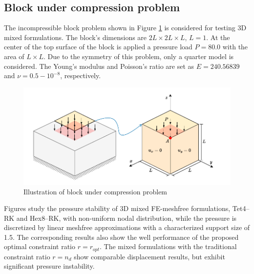 \subsection{Block under compression problem}
The incompressible block problem shown in Figure \ref{fg:block_model} is considered for testing 3D mixed formulations. The block's dimensions are $2L\times 2L \times L$, $L=1$.
At the center of the top surface of the block is applied a pressure load $P = 80.0$ with the area of $L\times L$.
Due to the symmetry of this problem, only a quarter model is considered.
The Young's modulus and Poisson's ratio are set as $E = 240.56839$ and $\nu = 0.5-10^{-8}$, respectively.

\begin{figure}[H]
\centering
\includegraphics[width=\textwidth]{pdf/block.pdf}
\caption{Illustration of block under compression problem}\label{fg:block_model}
\end{figure}

Figures study the pressure stability of 3D mixed FE-meshfree formulations, Tet4--RK and Hex8--RK, with non-uniform nodal distribution, while the pressure is discretized by linear meshfree approximations with a characterized support size of 1.5. The corresponding results also show the well performance of the proposed optimal constraint ratio $r=r_{opt}$. The mixed formulations with the traditional constraint ratio $r=n_d$ show comparable displacement results, but exhibit significant pressure instability.


